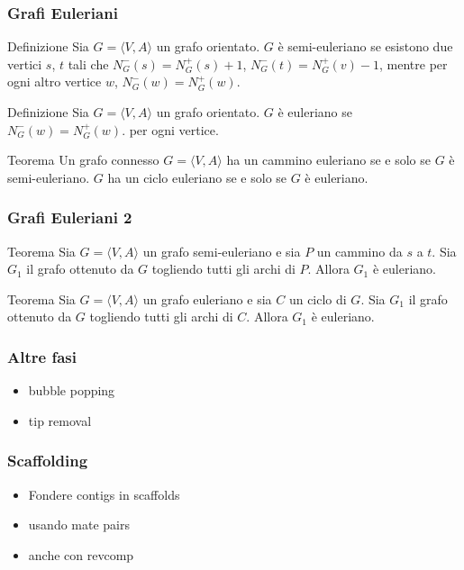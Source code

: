 \begin{frame}[fragile]
\frametitle{Grafi Euleriani}
\begin{block}{Definizione}
Sia $G=\langle  V,A \rangle$ un grafo orientato.
$G$ è semi-euleriano se esistono due vertici $s$, $t$ tali che $N^{-}_{G}(s) =
N^{+}_{G}(s) +1$,  $N^{-}_{G}(t) = N^{+}_{G}(v) -1$, mentre per ogni altro
vertice $w$,  $N^{-}_{G}(w) =N^{+}_{G}(w)$.
\end{block}

\begin{block}{Definizione}
Sia $G=\langle  V,A \rangle$ un grafo orientato.
$G$ è euleriano se $N^{-}_{G}(w) =N^{+}_{G}(w)$. per ogni
vertice.
\end{block}

\begin{block}{Teorema}
Un grafo connesso $G=\langle  V,A \rangle$ ha un cammino euleriano se e solo se $G$ è semi-euleriano.
$G$ ha un ciclo euleriano se e solo se $G$ è euleriano.
\end{block}
\end{frame}


\begin{frame}[fragile]
\frametitle{Grafi Euleriani 2}

\begin{block}{Teorema}
Sia $G=\langle  V,A \rangle$ un grafo semi-euleriano e sia $P$ un  cammino da $s$ a $t$.
Sia $G_{1}$ il grafo ottenuto da $G$ togliendo tutti gli archi di $P$.
Allora $G_{1}$ è euleriano.
\end{block}

\begin{block}{Teorema}
Sia $G=\langle  V,A \rangle$ un grafo euleriano e sia $C$ un ciclo di $G$.
Sia $G_{1}$ il grafo ottenuto da $G$ togliendo tutti gli archi di $C$.
Allora $G_{1}$ è euleriano.
\end{block}
\end{frame}

\begin{frame}[fragile]
\frametitle{Altre fasi}
\begin{itemize}
\item
bubble popping
\item
tip removal
\end{itemize}
\end{frame}

\begin{frame}[fragile]
\frametitle{Scaffolding}

\begin{itemize}
\item
Fondere contigs in scaffolds
\item
usando mate pairs
\item
anche con revcomp
\end{itemize}
\end{frame}



